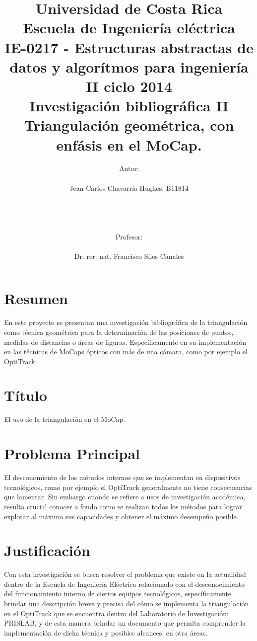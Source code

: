 \documentclass[11pt,letterpaper]{article}     %
\author{Autor: \\ \\Jean Carlos Chavarría Hughes, B11814\\ \\ \\ \\ \\Profesor:\\ \\Dr. rer. nat. Francisco Siles Canales \vspace*{2.0in}}
\title{Universidad de Costa Rica\\{\small Escuela de Ingeniería eléctrica\\ IE-0217 - Estructuras abstractas de datos y algor\' itmos para ingeniería\\II ciclo 2014\\\vspace*{0.55in} Investigación bibliográfica II}\\ Triangulaci\' on geom\' etrica, con enf\' asis en el MoCap.
\vspace*{1.35in}}
\begin{document}

\maketitle
\newpage
\tableofcontents
\newpage
\listoffigures
\newpage

\section{Resumen}
En este proyecto se presentan una investigaci\' on bibliogr\' afica de la triangulaci\' on como t\' ecnica geom\' etrica para la determinaci\' on de las posiciones de puntos, medidas de distancias o \' areas de figuras. Espec\' ificamente en su implementaci\' on en las t\' ecnicas de MoCaps \' opticos con m\' as de una c\' amara, como por ejemplo el OptiTrack.

\section{T\' itulo}
El uso de la triangulaci\' on en el MoCap.

\section{Problema Principal}
El desconomiento de los m\' etodos internos que se implementan en dispositivos tecnol\' ogicos, como por ejemplo el OptiTrack generalmente no tiene consecuencias que lamentar. Sin embargo cuando se refiere a usos de investigaci\' on acad\' emica, resulta crucial conocer a fondo como se realizan todos los m\' etodos para lograr explotar al m\' aximo sus capacidades y obtener el m\' aximo desempe\~ no posible.

\section{Justificación}
Con esta investigaci\' on se busca resolver el problema que existe en la actualidad dentro de la Escuela de Ingenier\' ia El\' ectrica relacionado con el desconocimiento del funcionamiento interno de ciertos equipos tecnol\' ogicos, espec\' ificamente brindar una descripci\' on breve y precisa del c\' omo se implementa la triangulaci\' on en el OptiTrack que se encuentra dentro del Laboratorio de Investigaci\' on: PRISLAB, y de esta manera brindar un documento que permita comprender la implementaci\' on de dicha t\' ecnica y posibles alcances. en otra \' areas.
\end{document}
